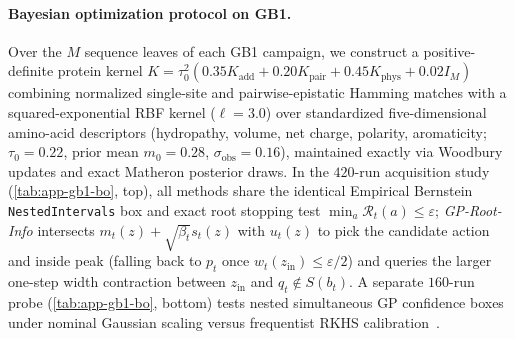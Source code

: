 \documentclass{article}
\theoremstyle{plain}
\theoremstyle{definition}
\begin{document}
\paragraph{Bayesian optimization protocol on GB1.}
Over the $M$ sequence leaves of each GB1 campaign, we construct a positive-definite protein kernel $K=\tau_0^2(0.35 K_{\mathrm{add}}+0.20 K_{\mathrm{pair}}+0.45 K_{\mathrm{phys}}+0.02 I_M)$ combining normalized single-site and pairwise-epistatic Hamming matches with a squared-exponential RBF kernel ($\ell=3.0$) over standardized five-dimensional amino-acid descriptors (hydropathy, volume, net charge, polarity, aromaticity; $\tau_0=0.22$, prior mean $m_0=0.28$, $\sigma_{\mathrm{obs}}=0.16$), maintained exactly via Woodbury updates and exact Matheron posterior draws. In the $420$-run acquisition study (\cref{tab:app-gb1-bo}, top), all methods share the identical Empirical Bernstein \texttt{NestedIntervals} box and exact root stopping test $\min_a\mathcal R_t(a)\le\varepsilon$; \emph{GP-Root-Info} intersects $m_t(z)+\sqrt{\beta_t}s_t(z)$ with $u_t(z)$ to pick the candidate action and inside peak (falling back to $p_t$ once $w_t(z_{\mathrm{in}})\le\varepsilon/2$) and queries the larger one-step width contraction between $z_{\mathrm{in}}$ and $q_t\notin S(b_t)$. A separate $160$-run probe (\cref{tab:app-gb1-bo}, bottom) tests nested simultaneous GP confidence boxes under nominal Gaussian scaling versus frequentist RKHS calibration~\citep{chowdhury2017kernelized}.
\end{document}
